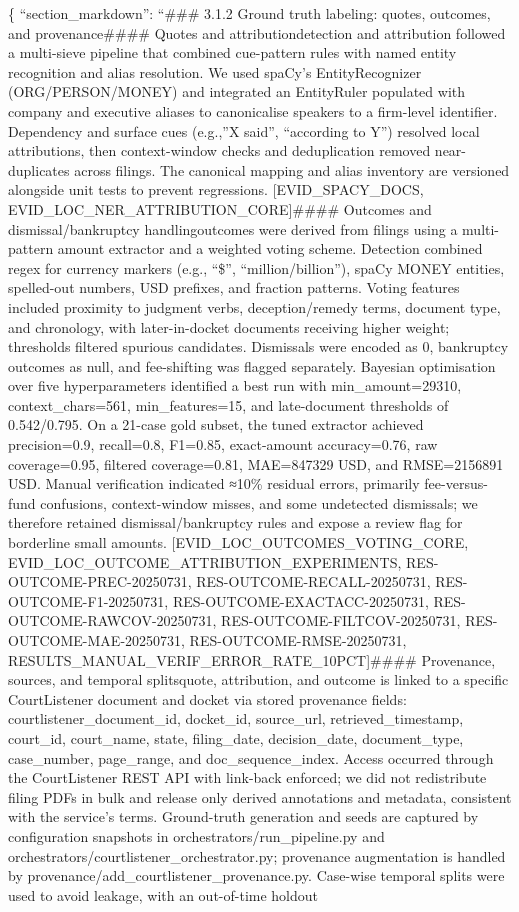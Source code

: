 \{
``section\_markdown'': ``\#\#\# 3.1.2 Ground truth labeling: quotes, outcomes, and provenance\n\n\#\#\#\# Quotes and attribution\nQuote detection and attribution followed a multi-sieve pipeline that combined cue-pattern rules with named entity recognition and alias resolution. We used spaCy's EntityRecognizer (ORG/PERSON/MONEY) and integrated an EntityRuler populated with company and executive aliases to canonicalise speakers to a firm-level identifier. Dependency and surface cues (e.g.,''X said'', ``according to Y'') resolved local attributions, then context-window checks and deduplication removed near-duplicates across filings. The canonical mapping and alias inventory are versioned alongside unit tests to prevent regressions. {[}EVID\_SPACY\_DOCS, EVID\_LOC\_NER\_ATTRIBUTION\_CORE{]}\n\n\#\#\#\# Outcomes and dismissal/bankruptcy handling\nCase outcomes were derived from filings using a multi-pattern amount extractor and a weighted voting scheme. Detection combined regex for currency markers (e.g., ``\$'', ``million/billion''), spaCy MONEY entities, spelled-out numbers, USD prefixes, and fraction patterns. Voting features included proximity to judgment verbs, deception/remedy terms, document type, and chronology, with later-in-docket documents receiving higher weight; thresholds filtered spurious candidates. Dismissals were encoded as 0, bankruptcy outcomes as null, and fee-shifting was flagged separately. Bayesian optimisation over five hyperparameters identified a best run with min\_amount=29310, context\_chars=561, min\_features=15, and late-document thresholds of 0.542/0.795. On a 21-case gold subset, the tuned extractor achieved precision=0.9, recall=0.8, F1=0.85, exact-amount accuracy=0.76, raw coverage=0.95, filtered coverage=0.81, MAE=847329 USD, and RMSE=2156891 USD. Manual verification indicated ≈10\% residual errors, primarily fee-versus-fund confusions, context-window misses, and some undetected dismissals; we therefore retained dismissal/bankruptcy rules and expose a review flag for borderline small amounts. {[}EVID\_LOC\_OUTCOMES\_VOTING\_CORE, EVID\_LOC\_OUTCOME\_ATTRIBUTION\_EXPERIMENTS, RES-OUTCOME-PREC-20250731, RES-OUTCOME-RECALL-20250731, RES-OUTCOME-F1-20250731, RES-OUTCOME-EXACTACC-20250731, RES-OUTCOME-RAWCOV-20250731, RES-OUTCOME-FILTCOV-20250731, RES-OUTCOME-MAE-20250731, RES-OUTCOME-RMSE-20250731, RESULTS\_MANUAL\_VERIF\_ERROR\_RATE\_10PCT{]}\n\n\#\#\#\# Provenance, sources, and temporal splits\nEvery quote, attribution, and outcome is linked to a specific CourtListener document and docket via stored provenance fields: courtlistener\_document\_id, docket\_id, source\_url, retrieved\_timestamp, court\_id, court\_name, state, filing\_date, decision\_date, document\_type, case\_number, page\_range, and doc\_sequence\_index. Access occurred through the CourtListener REST API with link-back enforced; we did not redistribute filing PDFs in bulk and release only derived annotations and metadata, consistent with the service's terms. Ground-truth generation and seeds are captured by configuration snapshots in orchestrators/run\_pipeline.py and orchestrators/courtlistener\_orchestrator.py; provenance augmentation is handled by provenance/add\_courtlistener\_provenance.py. Case-wise temporal splits were used to avoid leakage, with an out-of-time holdout 